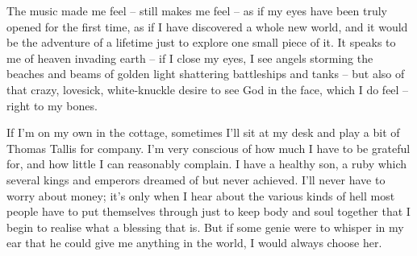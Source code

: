 The music made me feel -- still makes me feel -- as if my eyes have been truly opened for the first time, as if I have discovered a whole new world, and it would be the adventure of a lifetime just to explore one small piece of it. It speaks to me of heaven invading earth -- if I close my eyes, I see angels storming the beaches and beams of golden light shattering battleships and tanks -- but also of that crazy, lovesick, white-knuckle desire to see God in the face, which I do feel -- right to my bones.

If I'm on my own in the cottage, sometimes I'll sit at my desk and play a bit of Thomas Tallis for company. I'm very conscious of how much I have to be grateful for, and how little I can reasonably complain. I have a healthy son, a ruby which several kings and emperors dreamed of but never achieved. I'll never have to worry about money; it's only when I hear about the various kinds of hell most people have to put themselves through just to keep body and soul together that I begin to realise what a blessing that is. But if some genie were to whisper in my ear that he could give me anything in the world, I would always choose her.
